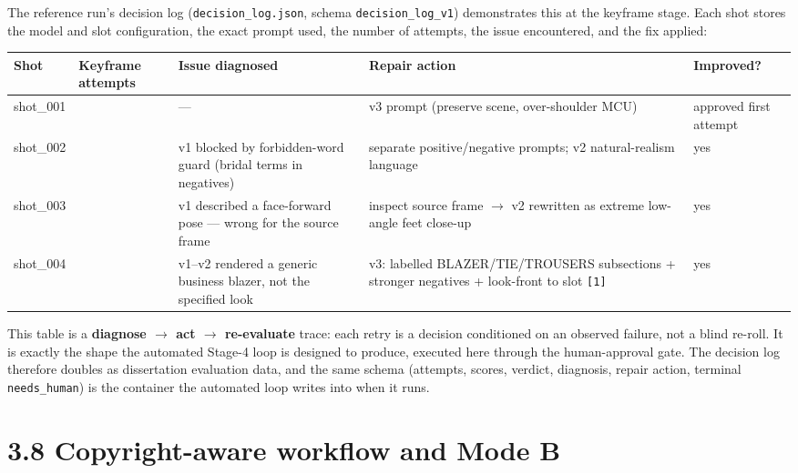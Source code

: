 \documentclass[10pt,twocolumn,letterpaper]{article}
\begin{document}
The reference run's decision log (\texttt{decision\_log.json}, schema \texttt{decision\_log\_v1}) demonstrates this at the keyframe stage. Each shot stores the model and slot configuration, the exact prompt used, the number of attempts, the issue encountered, and the fix applied:

\begin{table}[t]
\centering
\footnotesize
\begin{tabularx}{\textwidth}{l>{\RaggedRight\arraybackslash}X>{\RaggedRight\arraybackslash}X>{\RaggedRight\arraybackslash}X>{\RaggedRight\arraybackslash}X}
\toprule
Shot & Keyframe attempts & Issue diagnosed & Repair action & Improved? \\
\midrule
shot\_001 & 1 & --- & v3 prompt (preserve scene, over-shoulder MCU) & approved first attempt \\
shot\_002 & 2 & v1 blocked by forbidden-word guard (bridal terms in negatives) & separate positive/negative prompts; v2 natural-realism language & yes \\
shot\_003 & 2 & v1 described a face-forward pose --- wrong for the source frame & inspect source frame $\rightarrow$ v2 rewritten as extreme low-angle feet close-up & yes \\
shot\_004 & 3 & v1--v2 rendered a generic business blazer, not the specified look & v3: labelled BLAZER/TIE/TROUSERS subsections + stronger negatives + look-front to slot \texttt{[1]} & yes \\
\bottomrule
\end{tabularx}
\end{table}

This table is a \textbf{diagnose $\rightarrow$ act $\rightarrow$ re-evaluate} trace: each retry is a decision conditioned on an observed failure, not a blind re-roll. It is exactly the shape the automated Stage-4 loop is designed to produce, executed here through the human-approval gate. The decision log therefore doubles as dissertation evaluation data, and the same schema (attempts, scores, verdict, diagnosis, repair action, terminal \texttt{needs\_human}) is the container the automated loop writes into when it runs.


\section*{3.8 Copyright-aware workflow and Mode B}
\end{document}
